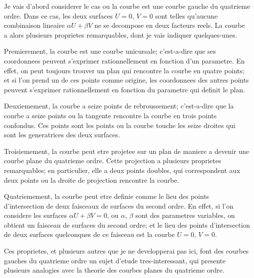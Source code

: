 \documentclass[11pt,a4paper]{book}
\begin{document}
Je vais d'abord considerer le cas ou la courbe est une courbe gauche du quatrieme
ordre. Dans ce cas, les deux surfaces $U = 0$, $V = 0$ sont telles qu'aucune combinaison
lineaire $\alpha U + \beta V$ ne se decompose en deux facteurs reels. La courbe a alors plusieurs
proprietes remarquables, dont je vais indiquer quelques-unes.

Premierement, la courbe est une courbe unicursale; c'est-a-dire que ses coordonnees
peuvent s'exprimer rationnellement en fonction d'un parametre. En effet, on peut
toujours trouver un plan qui rencontre la courbe en quatre points; et si l'on prend
un de ces points comme origine, les coordonnees des autres points peuvent s'exprimer
rationnellement en fonction du parametre qui definit le plan.

Deuxiemement, la courbe a seize points de rebroussement; c'est-a-dire que la
courbe a seize points ou la tangente rencontre la courbe en trois points confondus.
Ces points sont les points ou la courbe touche les seize droites qui sont les generatrices
des deux surfaces.

Troisiemement, la courbe peut etre projetee sur un plan de maniere a devenir une
courbe plane du quatrieme ordre. Cette projection a plusieurs proprietes remarquables;
en particulier, elle a deux points doubles, qui correspondent aux deux points ou la droite
de projection rencontre la courbe.

Quatriemement, la courbe peut etre definie comme le lieu des points d'intersection
de deux faisceaux de surfaces du second ordre. En effet, si l'on considere les surfaces
$\alpha U + \beta V = 0$, ou $\alpha$, $\beta$ sont des parametres variables, on obtient un faisceau de
surfaces du second ordre; et le lieu des points d'intersection de deux surfaces quelconques
de ce faisceau est la courbe $U = 0$, $V = 0$.

Ces proprietes, et plusieurs autres que je ne developperai pas ici, font des courbes
gauches du quatrieme ordre un sujet d'etude tres-interessant, qui presente plusieurs
analogies avec la theorie des courbes planes du quatrieme ordre.
\clearpage


\end{document}
